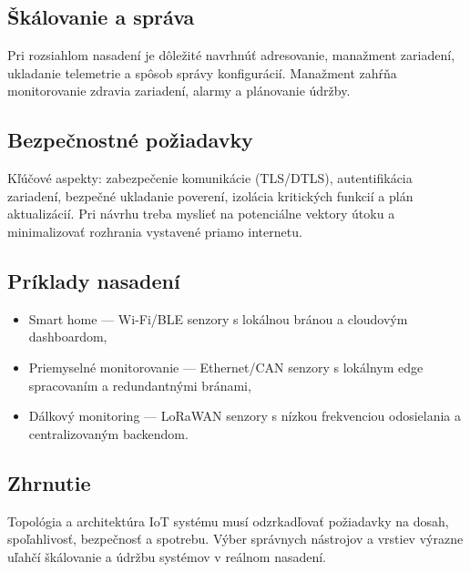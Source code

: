 \subsection{Škálovanie a správa}
Pri rozsiahlom nasadení je dôležité navrhnúť adresovanie, manažment zariadení, ukladanie telemetrie a spôsob správy konfigurácií. Manažment zahŕňa monitorovanie zdravia zariadení, alarmy a plánovanie údržby.

\subsection{Bezpečnostné požiadavky}
Kľúčové aspekty: zabezpečenie komunikácie (TLS/DTLS), autentifikácia zariadení, bezpečné ukladanie poverení, izolácia kritických funkcií a plán aktualizácií. Pri návrhu treba myslieť na potenciálne vektory útoku a minimalizovať rozhrania vystavené priamo internetu.

\subsection{Príklady nasadení}
\begin{itemize}
\item Smart home — Wi‑Fi/BLE senzory s lokálnou bránou a cloudovým dashboardom,
\item Priemyselné monitorovanie — Ethernet/CAN senzory s lokálnym edge spracovaním a redundantnými bránami,
\item Dálkový monitoring — LoRaWAN senzory s nízkou frekvenciou odosielania a centralizovaným backendom.
\end{itemize}

\subsection{Zhrnutie}
Topológia a architektúra IoT systému musí odzrkadľovať požiadavky na dosah, spoľahlivosť, bezpečnosť a spotrebu. Výber správnych nástrojov a vrstiev výrazne uľahčí škálovanie a údržbu systémov v reálnom nasadení.
